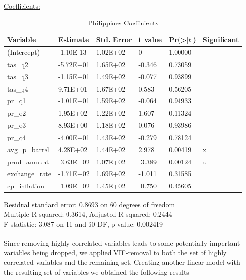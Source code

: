 \documentclass[11pt]{article}
\begin{document}
\underline{Coefficients:}
\FloatBarrier
\begin{table}[!htbp]
\centering
\begin{tabular}{llllll}
\hline
Variable       & Estimate  & Std. Error & t value & Pr(\textgreater$|t|$) & Significant \\ \hline
(Intercept)    & -1.10E-13 & 1.02E+02   & 0       & 1.00000             &             \\
tas\_q2        & -5.72E+01 & 1.65E+02   & -0.346  & 0.73059             &             \\
tas\_q3        & -1.15E+01 & 1.49E+02   & -0.077  & 0.93899             &             \\
tas\_q4        & 9.71E+01  & 1.67E+02   & 0.583   & 0.56205             &             \\
pr\_q1         & -1.01E+01 & 1.59E+02   & -0.064  & 0.94933             &             \\
pr\_q2         & 1.95E+02  & 1.22E+02   & 1.607   & 0.11324             &             \\
pr\_q3         & 8.93E+00  & 1.18E+02   & 0.076   & 0.93986             &             \\
pr\_q4         & -4.00E+01 & 1.43E+02   & -0.279  & 0.78124             &             \\
avg\_p\_barrel & 4.28E+02  & 1.44E+02   & 2.978   & 0.00419             & x           \\
prod\_amount   & -3.63E+02 & 1.07E+02   & -3.389  & 0.00124             & x           \\
exchange\_rate & -1.71E+02 & 1.69E+02   & -1.011  & 0.31585             &             \\
cp\_inflation  & -1.09E+02 & 1.45E+02   & -0.750  & 0.45605             &            \\ \hline
\end{tabular}
\caption{Philippines Coefficients}
\label{table12}
\end{table}
\FloatBarrier
Residual standard error: 0.8693 on 60 degrees of freedom \\
Multiple R-squared:  0.3614,	Adjusted R-squared:  0.2444 \\ 
F-statistic: 3.087 on 11 and 60 DF,  p-value: 0.002419 \\

\newpage
{}
\\
Since removing highly correlated variables leads to some potentially important variables being dropped, we applied VIF-removal to both the set of highly correlated variables and the remaining set.
Creating another linear model with the resulting set of variables we obtained the following results
\end{document}
